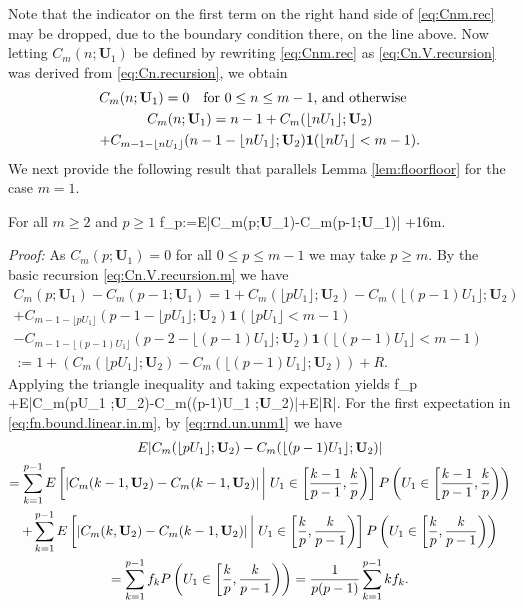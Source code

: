 \documentclass[12pt]{article}
\begin{document}
Note that the indicator on the first term on the right hand side of \eqref{eq:Cnm.rec} may be dropped, due to the boundary condition there, on the line above. Now letting $C_m(n;\textbf{U}_1)$ be defined by rewriting \eqref{eq:Cnm.rec} as \eqref{eq:Cn.V.recursion} was derived from \eqref{eq:Cn.recursion},
we obtain
\begin{multline} \label{eq:Cn.V.recursion.m}
C_m(n;\textbf{U}_1)=0 \qmq{for $0 \le n \le m-1$, and otherwise} \\
C_m(n;\textbf{U}_1) 
=n-1  + C_m(\lfloor nU_1 \rfloor; \textbf{U}_2) \\+ C_{m-1-\lfloor nU_1 \rfloor}(n-1-\lfloor nU_1 \rfloor; \textbf{U}_2)\textbf{1}(\lfloor nU_1 \rfloor < m-1).
\end{multline}
We next provide the following result that parallels Lemma \ref{lem:floorfloor} for the case $m=1$.

\begin{lemma} \label{lem:Cm.diff.10+16m}
	For all $m \ge 2$ and $p \ge 1$
	\beas
	f_p:=E|C_m(p;\textbf{U}_1)-C_m(p-1;\textbf{U}_1)| +16m.
	\enas
\end{lemma}
\noindent \emph{Proof:} 
As $C_m(p;\textbf{U}_1)=0$ for all $0 \le p \le m-1$ we may take $p \ge m$. 
By the basic recursion \eqref{eq:Cn.V.recursion.m} we have
\begin{multline*}
C_m(p;\textbf{U}_1)-C_m(p-1;\textbf{U}_1)
= 
1+C_m(\lfloor pU_1 \rfloor;\textbf{U}_2)-C_m(\lfloor (p-1)U_1 \rfloor;\textbf{U}_2)\\
+ C_{m-1-\lfloor pU_1 \rfloor}(p-1-\lfloor pU_1 \rfloor; \textbf{U}_2)\textbf{1}(\lfloor pU_1 \rfloor < m-1)\\
-C_{m-1-\lfloor (p-1)U_1 \rfloor}(p-2-\lfloor (p-1)U_1 \rfloor; \textbf{U}_2)\textbf{1}(\lfloor (p-1)U_1 \rfloor < m-1)\\ 
:= 1
+(C_m(\lfloor pU_1 \rfloor;\textbf{U}_2)-C_m(\lfloor (p-1)U_1 \rfloor;\textbf{U}_2))+R.
\end{multline*}
Applying the triangle inequality and taking expectation yields
\bea \label{eq:fn.bound.linear.in.m}
f_p +E|C_m(\lfloor pU_1 \rfloor;\textbf{U}_2)-C_m(\lfloor (p-1)U_1 \rfloor;\textbf{U}_2)|+E|R|.
\ena
For the first expectation in \eqref{eq:fn.bound.linear.in.m}, by \eqref{eq:rnd.un.unm1} we have 
\begin{multline*}
E|C_m(\lfloor pU_1 \rfloor;\textbf{U}_2)-C_m(\lfloor (p-1)U_1 \rfloor;\textbf{U}_2)|\\
= \sum_{k=1}^{p-1}E\left[ |C_m(k-1,\textbf{U}_2)-C_m(k-1,\textbf{U}_2)|\Bvert U_1 \in \left[ \frac{k-1}{p-1},\frac{k}{p}\right) \right]P\left(U_1 \in \left[ \frac{k-1}{p-1},\frac{k}{p}\right)\right)\\
+\sum_{k=1}^{p-1}E\left[ |C_m(k,\textbf{U}_2)-C_m(k-1,\textbf{U}_2)|\Bvert U_1 \in \left[ \frac{k}{p},\frac{k}{p-1}\right) \right]P\left(U_1 \in \left[ \frac{k}{p},\frac{k}{p-1}\right)\right)\\
= \sum_{k=1}^{p-1} f_k P\left(U_1 \in \left[\frac{k}{p},\frac{k}{p-1}\right) \right)
= \frac{1}{p(p-1)}\sum_{k=1}^{p-1} kf_k.
\end{multline*}
\end{document}

